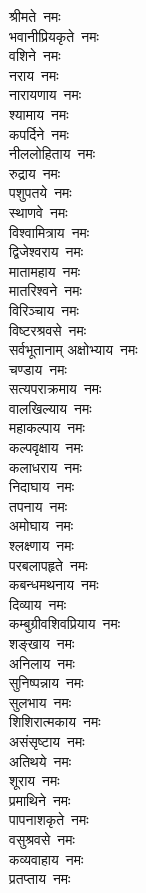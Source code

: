 \begin{multicols}{2}
\begin{flushleft}
श्रीमते~नमः\\
भवानीप्रियकृते~नमः\\
वशिने~नमः\\
नराय~नमः\\
नारायणाय~नमः\\
श्यामाय~नमः\\
कपर्दिने~नमः\\
नीललोहिताय~नमः\\
रुद्राय~नमः\\
पशुपतये~नमः\hfill{}\\
स्थाणवे~नमः\\
विश्वामित्राय~नमः\\
द्विजेश्वराय~नमः\\
मातामहाय~नमः\\
मातरिश्वने~नमः\\
विरिञ्चाय~नमः\\
विष्टरश्रवसे~नमः\\
सर्वभूतानाम् अक्षोभ्याय~नमः\\
चण्डाय~नमः\\
सत्यपराक्रमाय~नमः\hfill{}\\
वालखिल्याय~नमः\\
महाकल्पाय~नमः\\
कल्पवृक्षाय~नमः\\
कलाधराय~नमः\\
निदाघाय~नमः\\
तपनाय~नमः\\
अमोघाय~नमः\\
श्लक्ष्णाय~नमः\\
परबलापहृते~नमः\\
कबन्धमथनाय~नमः\hfill{}\\
दिव्याय~नमः\\
कम्बुग्रीवशिवप्रियाय~नमः\\
शङ्खाय~नमः\\
अनिलाय~नमः\\
सुनिष्पन्नाय~नमः\\
सुलभाय~नमः\\
शिशिरात्मकाय~नमः\\
असंसृष्टाय~नमः\\
अतिथये~नमः\\
शूराय~नमः\hfill{}\\
प्रमाथिने~नमः\\
पापनाशकृते~नमः\\
वसुश्रवसे~नमः\\
कव्यवाहाय~नमः\\
प्रतप्ताय~नमः\\

\end{flushleft}
\end{multicols}
